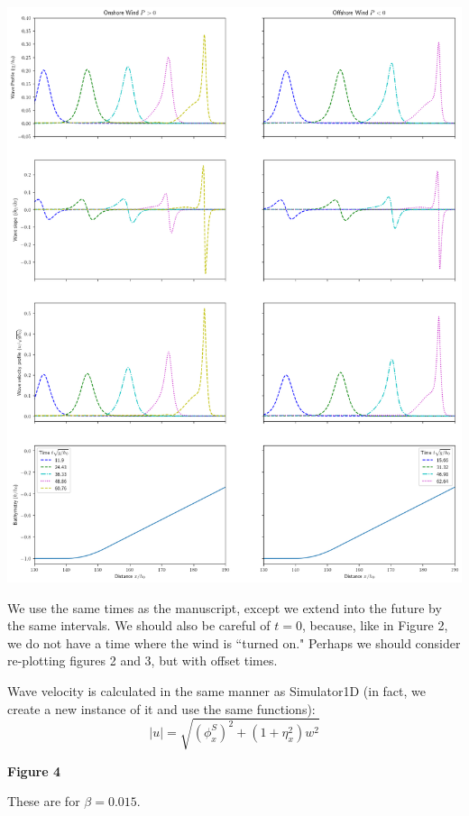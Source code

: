 \documentclass[10pt,a4paper]{article}
\begin{document}
\includegraphics[scale=0.35]{Fig3.png}

We use the same times as the manuscript, except we extend into the future by the same intervals. We should also be careful of $t=0$, because, like in Figure 2, we do not have a time where the wind is ``turned on." Perhaps we should consider re-plotting figures 2 and 3, but with offset times.

Wave velocity is calculated in the same manner as Simulator1D (in fact, we create a new instance of it and use the same functions):
$$|u| = \sqrt{(\phi^S_x)^2 + (1+\eta_x^2)w^2}$$
\pagebreak


{\bf\huge Figure 4}

These are for $\beta = 0.015$.
\end{document}
